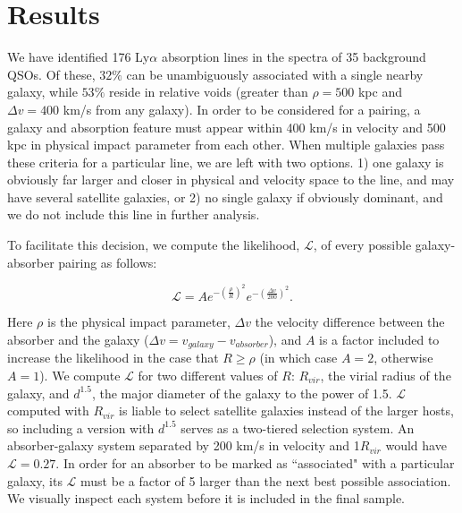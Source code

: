 \documentclass[iop]{emulateapj-rtx4}
\begin{document}
\section{Results}

We have identified 176 Ly$\alpha$ absorption lines in the spectra of 35 background QSOs. Of these, $32\%$ can be unambiguously associated with a single nearby galaxy, while $53\%$ reside in relative voids (greater than $\rho = 500$ kpc and $\Delta v = 400$ km/s from any galaxy). In order to be considered for a pairing, a galaxy and absorption feature must appear within 400 km/s in velocity and 500 kpc in physical impact parameter from each other. When multiple galaxies pass these criteria for a particular line, we are left with two options. 1) one galaxy is obviously far larger and closer in physical and velocity space to the line, and may have several satellite galaxies, or 2) no single galaxy if obviously dominant, and we do not include this line in further analysis. 

To facilitate this decision, we compute the likelihood, $\mathcal{L}$, of every possible galaxy-absorber pairing as follows:

\begin{equation}
	\mathcal{L} = A e^{-(\frac{\rho}{R})^2} e^{-(\frac{\Delta v}{200})^2}.
\end{equation}

\noindent Here $\rho$ is the physical impact parameter, $\Delta v$ the velocity difference between the absorber and the galaxy ($\Delta v = v_{galaxy} - v_{absorber}$), and $A$ is a factor included to increase the likelihood in the case that $R \geq \rho$ (in which case $A = 2$, otherwise $A = 1$). We compute $\mathcal{L}$ for two different values of $R$: $R_{vir}$, the virial radius of the galaxy, and $d^{1.5}$, the major diameter of the galaxy to the power of 1.5. $\mathcal{L}$ computed with $R_{vir}$ is liable to select satellite galaxies instead of the larger hosts, so including a version with $d^{1.5}$ serves as a two-tiered selection system. An absorber-galaxy system separated by 200 km/s in velocity and 1$R_{vir}$ would have $\mathcal{L} = 0.27$. In order for an absorber to be marked as ``associated" with a particular galaxy, its $\mathcal{L}$ must be a factor of 5 larger than the next best possible association. We visually inspect each system before it is included in the final sample.
\end{document}
